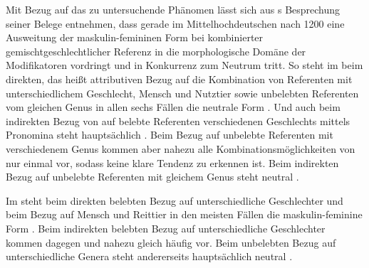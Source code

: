 Mit Bezug auf das zu untersuchende Phänomen lässt sich aus
\citeauthor{askedal1973}s Besprechung seiner Belege entnehmen, dass gerade im
Mittelhochdeutschen nach 1200
eine Ausweitung der maskulin-femininen Form bei kombinierter
gemischt\-geschlechtlicher Referenz in die morphologische Domäne der
Modifikatoren vordringt und in Konkurrenz zum Neutrum tritt. So steht im
 beim direkten, das heißt attributiven Bezug auf die Kombination
von Referenten mit unterschiedlichem Geschlecht, Mensch und Nutztier sowie
unbelebten Referenten vom gleichen Genus in allen sechs Fällen die neutrale
Form .
Und auch beim indirekten Bezug von  auf belebte Referenten
verschiedenen Geschlechts mittels Pronomina steht hauptsächlich . Beim Bezug auf unbelebte Referenten mit verschiedenem Genus kommen
aber nahezu alle Kombinationsmöglichkeiten von 
nur einmal vor, sodass keine klare Tendenz zu erkennen ist. Beim indirekten
Bezug auf unbelebte Referenten mit gleichem Genus steht neutral  \autocites[145--148, 158--161]{askedal1973}[nach][]{lachmannhartl1952}.

Im  steht beim direkten belebten Bezug auf unterschiedliche
Geschlechter und beim Bezug auf Mensch und Reittier in den meisten Fällen die
maskulin-feminine Form .
Beim indirekten belebten Bezug auf unterschiedliche Geschlechter kommen dagegen
 und  nahezu gleich häufig vor. Beim unbelebten
Bezug auf unterschiedliche Genera steht andererseits hauptsächlich neutral
 \autocites[95--99,
126--128]{askedal1973}[nach][]{maroldschroeder1969}.

